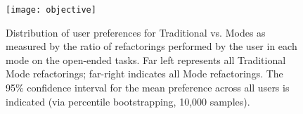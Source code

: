 \begin{figure}
\texttt{[image: objective]}
\caption{Distribution of user preferences for Traditional vs. \deuce{} Modes as measured by the
ratio of refactorings performed by the user in each mode on the open-ended tasks. Far left
represents all Traditional Mode refactorings; far-right indicates all \deuce{} Mode refactorings.
The 95\% confidence interval for the mean preference across all users is indicated (via percentile bootstrapping, 10,000 samples).}
\label{fig:objective}
\end{figure}
